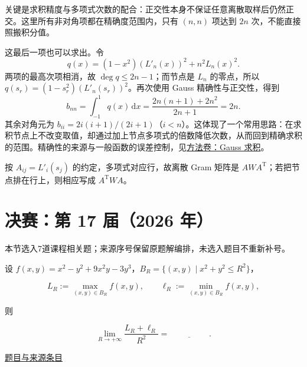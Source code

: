 \documentclass[12pt,fontset=fandol]{ctexart}
\begin{document}
\begin{remark}[方法与条件]关键是求积精度与多项式次数的配合：正交性本身不保证任意离散取样后仍然正交。这里所有非对角项都在精确度范围内，只有 $(n,n)$ 项达到 $2n$ 次，不能直接照搬积分值。

这最后一项也可以求出。令
\[
q(x)=(1-x^2)(L'_n(x))^2+n^2L_n(x)^2.
\]
两项的最高次项相消，故 $\deg q\le2n-1$；而节点是 $L_n$ 的零点，所以 $q(s_r)=(1-s_r^2)(L'_n(s_r))^2$。再次使用 Gauss 精确性与正交性，得到
\[
b_{nn}=\int_{-1}^1q(x)\,\mathrm dx
=\frac{2n(n+1)+2n^2}{2n+1}=2n.
\]
其余对角元为 $b_{ii}=2i(i+1)/(2i+1)$（$i<n$）。这体现了一个常用思路：在求积节点上不改变取值，却通过加上节点多项式的倍数降低次数，从而回到精确求积的范围。精确性的来源与一般函数的误差控制，见\hyperref[app:estimate-gauss]{方法卷：Gauss 求积}。

按 $A_{ij}=L'_i(s_j)$ 的约定，多项式对应行，故离散 Gram 矩阵是 $AWA^{\mathrm T}$；若把节点排在行上，则相应写成 $A^{\mathrm T}WA$。\end{remark}

\section{决赛：第 17 届（2026 年）}

本节选入7道课程相关题；来源序号保留原题解编排，未选入题目不重新补号。

\begin{example}[来源序号2]\label{ex:fin17-high:2}\label{pr:fin17-high:2}

设 $f(x,y)=x^2-y^2+9x^2y-3y^3$，$B_R=\{(x,y)\mid x^2+y^2\le R^2\}$，

\[
L_R:=\max_{(x,y)\in B_R}f(x,y),\qquad \ell_R:=\min_{(x,y)\in B_R}f(x,y),
\]

则

\[
\lim_{R\to+\infty}\frac{L_R+\ell_R}{R^2}=\underline{\hspace{2cm}}.
\]

\par\href{https://github.com/lzxcr/cmc-mathematics/blob/64916fa1fdbc3e444a652eca204d5669058ee321/src/problems/finals/17/02.md}{题目与来源条目}

\end{example}
\end{document}

